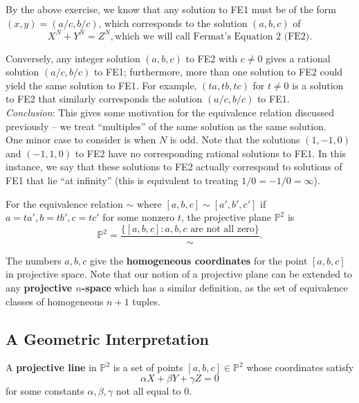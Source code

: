 \documentclass[11pt]{article}
\begin{document}
By the above exercise, we know that any solution to FE1 must be of the form $(x, y) = (a/c, b/c)$, which corresponds to the solution $(a, b, c)$ of
\[ X^N + Y^N = Z^N, \text{which we will call Fermat's Equation 2 (FE2).} \]

Conversely, any integer solution $(a, b, c)$ to FE2
with $c \neq 0$ gives a rational solution $(a/c, b/c)$ to FE1; furthermore, more than one solution to FE2 could yield the same solution to FE1. For example, $(ta, tb, tc)$ for $t\neq 0$ is a solution to FE2 that similarly corresponds the solution $(a/c, b/c)$ to FE1. \\

\textit{Conclusion}: This gives some motivation for the equivalence relation discussed previously -- we treat ``multiples'' of the same solution as the same solution.  \\

One minor case to consider is when $N$ is odd. Note that the solutions $(1, -1, 0)$ and $(-1, 1, 0)$ to FE2 have no corresponding rational solutions to FE1. In this instance, we say that these solutions to FE2 actually correspond to solutions of FE1 that lie ``at infinity'' (this is equivalent to treating $1/0 = -1/0 = \infty$). \\

\begin{definition}
    For the equivalence relation $\sim$ where $[a, b, c] \sim [a', b', c']$ if $a = ta', b=tb', c=tc'$ for some nonzero $t$, the projective plane $\mathbb{P}^2$ is
\[ \mathbb{P}^2 = \frac{\{[a, b, c] : a, b, c \text{ are not all zero} \}}{\sim}.\]
\end{definition}

The numbers $a, b, c$ give the \textbf{homogeneous coordinates} for the point $[a, b, c]$ in projective space. Note that our notion of a projective plane can be extended to any \textbf{projective $n$-space} which has a similar definition, as the set of equivalence classes of homogeneous $n+1$ tuples. \\

\subsection{A Geometric Interpretation}

\begin{definition}
A \textbf{projective line} in $\mathbb{P}^2$ is a set of points $[a, b, c] \in \mathbb{P}^2$ whose coordinates satisfy \[\alpha X + \beta Y + \gamma Z = 0\] for some constants $\alpha, \beta, \gamma$ not all equal to $0$.
\end{definition} 
\end{document}
